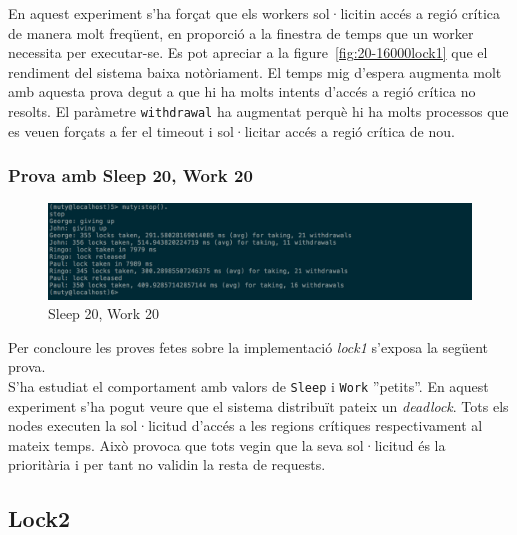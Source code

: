 \documentclass[a4paper, 11pt]{article}
\begin{document}
En aquest experiment s'ha forçat que els workers sol·licitin accés a regió
crítica de manera molt freqüent, en proporció a la finestra de temps que un
worker necessita per executar-se.  
Es pot apreciar a la figure~\ref{fig:20-16000lock1} que el rendiment del sistema
baixa notòriament. El temps mig d'espera augmenta molt amb aquesta prova degut a
que hi ha molts intents d'accés a regió crítica no resolts. El paràmetre
\texttt{withdrawal} ha augmentat perquè hi ha molts processos que es veuen
forçats a fer el timeout i sol·licitar accés a regió crítica de nou.

\subsubsection{Prova amb Sleep 20, Work 20}

\begin{figure}[H]
	\centering
    \includegraphics[width=1.0\textwidth]{figures/20-20lock1}
    \caption{Sleep 20, Work 20 \label{fig:20-20lock1}}    
\end{figure}

Per concloure les proves fetes sobre la implementació \textit{lock1} s'exposa la següent prova. \\
S'ha estudiat el comportament amb valors de \texttt{Sleep} i \texttt{Work}
''petits''. En aquest experiment s'ha pogut veure que el sistema distribuït
pateix un \emph{deadlock}. Tots els nodes executen la sol·licitud d'accés a les regions
crítiques respectivament al mateix temps. Això provoca que tots vegin que la
seva sol·licitud és la prioritària i per tant no validin la resta de requests.

\subsection{Lock2}
\end{document}
